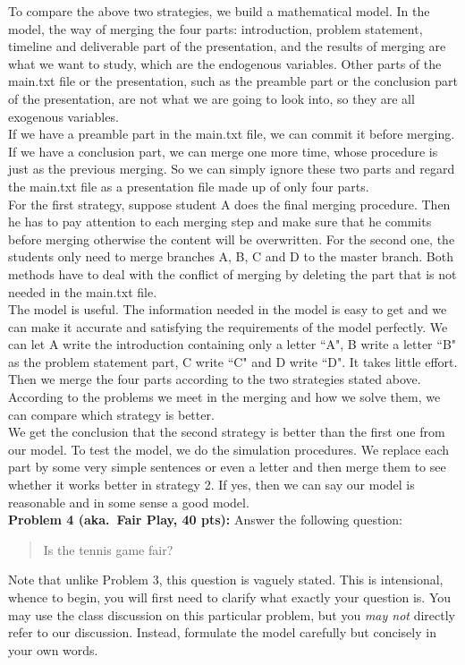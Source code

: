 \documentclass[12pt]{article}
\begin{document}
To compare the above two strategies, we build a mathematical model. In the model, the way of merging the four parts: introduction, problem statement, timeline and deliverable part of the presentation, and the results of merging are what we want to study, which are the endogenous variables. Other parts of the main.txt file or the presentation, such as the preamble part or the conclusion part of the presentation, are not what we are going to look into, so they are all exogenous variables.\\

If we have a preamble part in the main.txt file, we can commit it before merging. If we have a conclusion part, we can merge one more time, whose procedure is just as the previous merging. So we can simply ignore these two parts and regard the main.txt file as a presentation file made up of only four parts.\\

For the first strategy, suppose student A does the final merging procedure. Then he has to pay attention to each merging step and make sure that he commits before merging otherwise the content will be overwritten. For the second one, the students only need to merge branches A, B, C and D to the master branch. Both methods have to deal with the conflict of merging by deleting the part that is not needed in the main.txt file.\\

The model is useful. The information needed in the model is easy to get and we can make it accurate and satisfying the requirements of the model perfectly. We can let A write the introduction containing only a letter ``A", B write a letter ``B" as the problem statement part, C write ``C" and D write ``D". It takes little effort. Then we merge the four parts according to the two strategies stated above. According to the problems we meet in the merging and how we solve them, we can compare which strategy is better.\\

We get the conclusion that the second strategy is better than the first one from our model. To test the model, we do the simulation procedures. We replace each part by some very simple sentences or even a letter and then merge them to see whether it works better in strategy 2. If yes, then we can say our model is reasonable and in some sense a good model.\\


\newpage
\vskip0.25in
\noindent\textbf{Problem 4 (aka.\ Fair Play, 40 pts):}
Answer the following question:
\begin{verse}
Is the tennis game fair?
\end{verse}
Note that unlike Problem 3, this question is vaguely stated.
This is intensional, whence to begin, you will first need to clarify
what exactly your question is.
You may use the class discussion on this particular 
problem, but you \emph{may not} directly refer to our 
discussion.  Instead, formulate the model carefully but concisely in 
your own words.   
\end{document}
